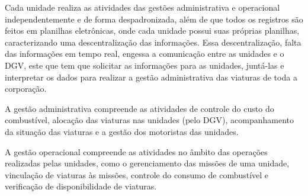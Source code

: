   Cada unidade realiza as atividades das gestões administrativa e operacional independentemente e de forma despadronizada, 
  além de que todos os registros são feitos em planilhas eletrônicas, onde cada unidade possui suas próprias planilhas, 
  caracterizando uma descentralização das informações. Essa descentralização, falta das informações em tempo real, engessa 
  a comunicação entre as unidades e o DGV, este que tem que solicitar as informações para as unidades, juntá-las e interpretar 
  os dados para realizar a gestão administrativa das viaturas de toda a corporação.
  
  A gestão administrativa compreende as atividades de controle do custo do combustível, alocação das viaturas nas unidades
  (pelo DGV), acompanhamento da situação das viaturas e a gestão dos motoristas das unidades.
  
  A gestão operacional compreende as atividades no âmbito das operações realizadas pelas unidades, como o gerenciamento das 
  missões de uma unidade, vinculação de viaturas às missões, controle do consumo de combustível e verificação de 
  disponibilidade de viaturas.